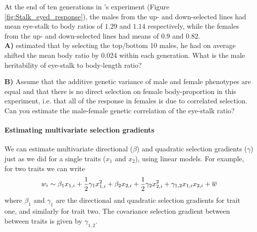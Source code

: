 \begin{question}

At the end of ten generations in \citeauthor{wilkinson:93}'s experiment (Figure
\ref{fig:Stalk_eyed_response}), the males from the up- and down-selected
lines had mean eye-stalk to body ratios of $1.29$ and $1.14$
respectively, while the females from the up- and down-selected lines
had means of $0.9$ and $0.82$. \\
{\bf A)} \citeauthor{wilkinson:93} estimated that by selecting the top/bottom 10 males, he had on average shifted the mean body ratio by 0.024 within
each generation. What is the male heritability of eye-stalk to body-length ratio?

{\bf B)} Assume that the additive genetic variance of male and female phenotypes are
equal and that there is no direct
selection on female body-proportion in this experiment, i.e. that all of
the response in females is due to correlated selection. Can you
estimate the male-female genetic correlation of the eye-stalk ratio? 
\end{question}

\paragraph{Estimating multivariate selection gradients}
We can estimate multivariate directional ($\beta$) and quadratic selection
gradients ($\gamma$) just as we did for a single traits ($x_1$ and $x_2$), using linear
models. For example, for two traits we can write
\begin{equation}
w_i \sim \beta_1 x_{1,i} + \frac{1}{2} \gamma_1 x_{1,i}^2 + \beta_2 x_{2,i} + \frac{1}{2} 
\gamma_2 x_{2,i}^2  + \gamma_{1,2} x_{1,i} x_{2,i}  + \overline{w} \label{fitness_regression}
 \end{equation}
where $\beta_1$ and $\gamma_1$ are the directional and quadratic
selection gradients for trait one, and similarly for trait two. The
covariance selection gradient between between traits is given by
$\gamma_{1,2}$. 

